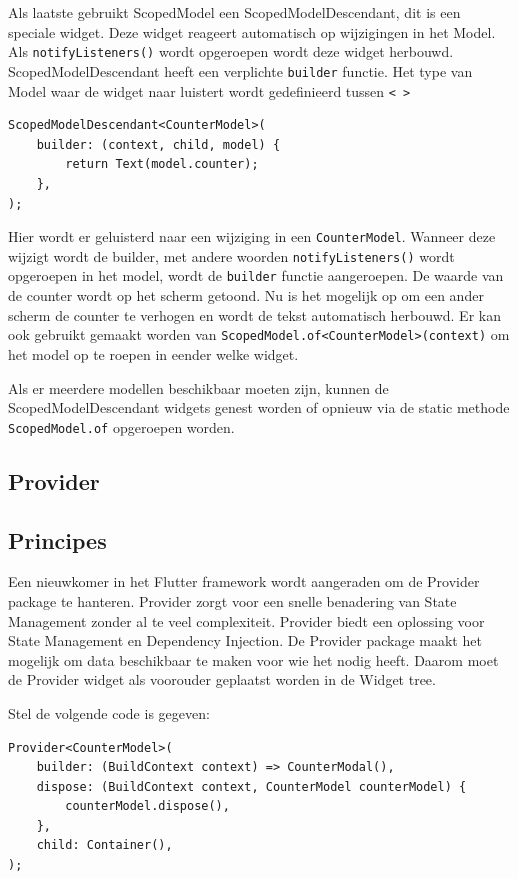 Als laatste gebruikt ScopedModel een ScopedModelDescendant, dit is een speciale widget. Deze widget reageert automatisch op wijzigingen in het Model. Als \verb|notifyListeners()| wordt opgeroepen wordt deze widget herbouwd.
ScopedModelDescendant heeft een verplichte \verb|builder| functie. Het type van Model waar de widget naar luistert wordt gedefinieerd tussen \verb|< >|
\begin{verbatim}
ScopedModelDescendant<CounterModel>(
    builder: (context, child, model) {
        return Text(model.counter);
    },
);
\end{verbatim}
Hier wordt er geluisterd naar een wijziging in een \verb|CounterModel|. Wanneer deze wijzigt wordt de builder, met andere woorden \verb|notifyListeners()| wordt opgeroepen in het model, wordt de \verb|builder| functie aangeroepen. De waarde van de counter wordt op het scherm getoond. Nu is het mogelijk op om een ander scherm de counter te verhogen en wordt de tekst automatisch herbouwd. Er kan ook gebruikt gemaakt worden van \verb|ScopedModel.of<CounterModel>(context)| om het model op te roepen in eender welke widget.

Als er meerdere modellen beschikbaar moeten zijn, kunnen de ScopedModelDescendant widgets genest worden of opnieuw via de static methode \verb|ScopedModel.of| opgeroepen worden.

\subsection{Provider}
\subsection*{Principes}
Een nieuwkomer in het Flutter framework wordt aangeraden om de Provider package te hanteren. Provider zorgt voor een snelle benadering van State Management zonder al te veel complexiteit. Provider biedt een oplossing voor State Management en Dependency Injection.
De Provider package maakt het mogelijk om data beschikbaar te maken voor wie het nodig heeft. Daarom moet de Provider widget als voorouder geplaatst worden in de Widget tree.

Stel de volgende code is gegeven:
\begin{verbatim}
Provider<CounterModel>(
    builder: (BuildContext context) => CounterModal(),
    dispose: (BuildContext context, CounterModel counterModel) {
        counterModel.dispose(),
    },
    child: Container(),
);
\end{verbatim}


